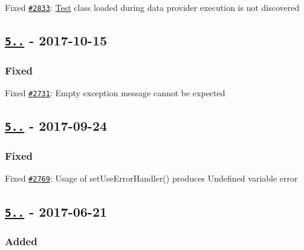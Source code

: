 \begin{DoxyItemize}
\item Fixed \href{https://github.com/sebastianbergmann/phpunit/issues/2833}{\tt \#2833}\+: \mbox{\hyperlink{class_test}{Test}} class loaded during data provider execution is not discovered
\end{DoxyItemize}

\subsection*{\href{https://github.com/sebastianbergmann/phpunit/compare/5.7.22...5.7.23}{\tt 5..} -\/ 2017-\/10-\/15}

\subsubsection*{Fixed}


\begin{DoxyItemize}
\item Fixed \href{https://github.com/sebastianbergmann/phpunit/issues/2731}{\tt \#2731}\+: Empty exception message cannot be expected
\end{DoxyItemize}

\subsection*{\href{https://github.com/sebastianbergmann/phpunit/compare/5.7.21...5.7.22}{\tt 5..} -\/ 2017-\/09-\/24}

\subsubsection*{Fixed}


\begin{DoxyItemize}
\item Fixed \href{https://github.com/sebastianbergmann/phpunit/issues/2769}{\tt \#2769}\+: Usage of {\ttfamily set\+Use\+Error\+Handler()} produces {\ttfamily Undefined variable} error
\end{DoxyItemize}

\subsection*{\href{https://github.com/sebastianbergmann/phpunit/compare/5.7.20...5.7.21}{\tt 5..} -\/ 2017-\/06-\/21}

\subsubsection*{Added}


